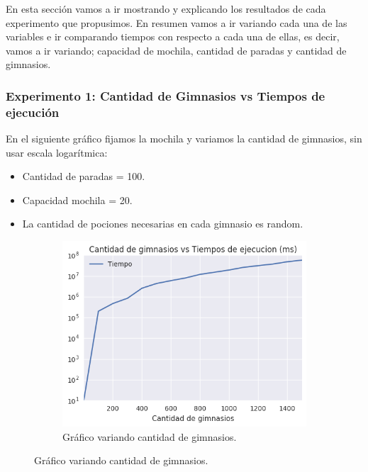 
En esta sección vamos a ir mostrando y explicando los resultados de cada experimento que propusimos.
En resumen vamos a ir variando cada una de las variables e ir comparando tiempos con respecto a cada una de ellas, es decir, vamos a ir variando; capacidad de mochila, cantidad de paradas y cantidad de gimnasios.

\subsubsection{Experimento 1: Cantidad de Gimnasios vs Tiempos de ejecución}

En el siguiente gráfico fijamos la mochila y variamos la cantidad de gimnasios, sin usar escala logarítmica:

\begin{itemize}
\item Cantidad de paradas = 100.
\item Capacidad mochila = 20.
\item La cantidad de pociones necesarias en cada gimnasio es random.
\end{itemize}


\begin{figure}[H]
  \begin{center}
    \begin{subfigure}[b]{0.70\textwidth}	
        \includegraphics[width=\textwidth]{img/ejercicio2/losPosta/grafico_gimnasios.png}
        \caption{Gráfico variando cantidad de gimnasios.}
        \label{fig: ejercicio1_ejemplo_camino1_2}
    \end{subfigure}
  \end{center}
\end{figure}


